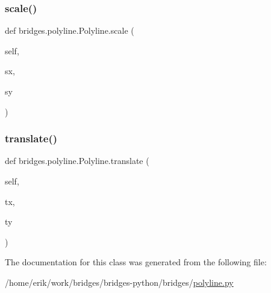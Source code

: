 \mbox{\label{classbridges_1_1polyline_1_1_polyline_a2727d3d6fa9da5ea738c51f822da16ae}} 
\subsubsection{\texorpdfstring{scale()}{scale()}}
{\footnotesize\ttfamily def bridges.\+polyline.\+Polyline.\+scale (\begin{DoxyParamCaption}\item[{}]{self,  }\item[{}]{sx,  }\item[{}]{sy }\end{DoxyParamCaption})}

\mbox{\label{classbridges_1_1polyline_1_1_polyline_a654226c0de86aa0c6b9b5181a552cbfe}} 
\subsubsection{\texorpdfstring{translate()}{translate()}}
{\footnotesize\ttfamily def bridges.\+polyline.\+Polyline.\+translate (\begin{DoxyParamCaption}\item[{}]{self,  }\item[{}]{tx,  }\item[{}]{ty }\end{DoxyParamCaption})}



The documentation for this class was generated from the following file\+:\begin{DoxyCompactItemize}
\item 
/home/erik/work/bridges/bridges-\/python/bridges/\hyperlink{polyline_8py}{polyline.\+py}\end{DoxyCompactItemize}
